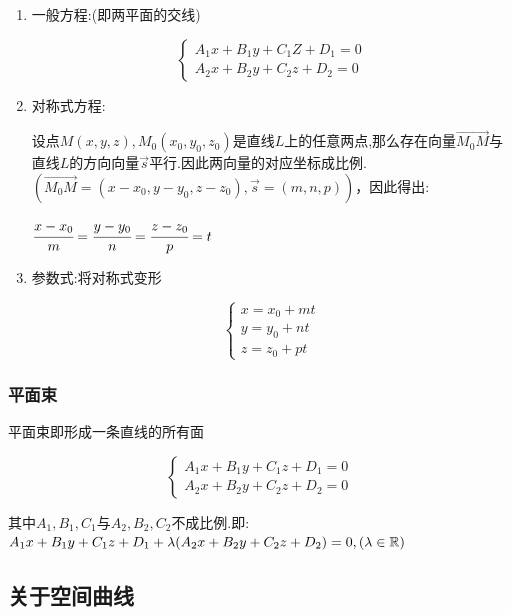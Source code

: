 {{{      \begin{enumerate}
        \item {
              一般方程:(即两平面的交线)

              $$
                \begin{cases}
                  A_1x + B_1y + C_1Z + D_1 = 0 \\
                  A_2x + B_2y + C_2z + D_2 = 0
                \end{cases}
              $$
              }
        \item {
              对称式方程:

              设点$M(x,y,z),M_0(x_0,y_0,z_0)$是直线$L$上的任意两点,那么存在向量$\vec{M_0M}$与直线$L$的方向向量$\vec{s}$平行.因此两向量的对应坐标成比例.$(\vec{M_0M} = (x - x_0, y - y_0, z - z_0), \vec{s} = (m,n,p))$，因此得出:

              $\cfrac{x - x_0}{m} = \cfrac{y - y_0}{n} = \cfrac{z - z_0}{p} = t$
              }
        \item {
              参数式:将对称式变形

              $$
                \begin{cases}
                  x = x_0 + mt \\
                  y = y_0 + nt \\
                  z = z_0 + pt
                \end{cases}
              $$
              }
      \end{enumerate}
    }%

    \subsubsection{平面束}{
      平面束即形成一条直线的所有面

      $$
        \begin{cases}
          A_1x + B_1y + C_1z + D_1 = 0 \\
          A_2x + B_2y + C_2z + D_2 = 0
        \end{cases}
      $$

      其中$A_1,B_1,C_1$与$A_2,B_2,C_2$不成比例.即:$A_1x + B_1y + C_1z + D_1 + \lambda(A_2x + B_2y + C_2z + D_2) = 0, (\lambda \in \operatorname{\mathbb{R}})$
    }%

  }%

  \subsection{关于空间曲线}{

}}
